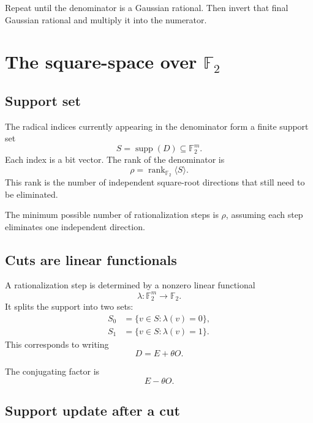 \documentclass[11pt]{article}
\newcommand{\FF}{\mathbb{F}}
\newcommand{\supp}{\operatorname{supp}}
\newcommand{\rank}{\operatorname{rank}}
\begin{document}
Repeat until the denominator is a Gaussian rational. Then invert that final Gaussian rational and multiply it into the numerator.

\section{The square-space over \texorpdfstring{\(\FF_2\)}{F2}}

\subsection{Support set}

The radical indices currently appearing in the denominator form a finite support set
\begin{equation}
  S = \supp(D)\subseteq \FF_2^m.
\end{equation}
Each index is a bit vector. The rank of the denominator is
\begin{equation}
  \rho=\rank_{\FF_2}\langle S\rangle.
\end{equation}
This rank is the number of independent square-root directions that still need to be eliminated.

The minimum possible number of rationalization steps is \(\rho\), assuming each step eliminates one independent direction.

\subsection{Cuts are linear functionals}

A rationalization step is determined by a nonzero linear functional
\begin{equation}
  \lambda:\FF_2^m\to\FF_2.
\end{equation}
It splits the support into two sets:
\begin{align}
  S_0&=\{v\in S:\lambda(v)=0\},\\
  S_1&=\{v\in S:\lambda(v)=1\}.
\end{align}
This corresponds to writing
\begin{equation}
  D=E+\theta O.
\end{equation}

The conjugating factor is
\begin{equation}
  E-\theta O.
\end{equation}

\subsection{Support update after a cut}
\end{document}
